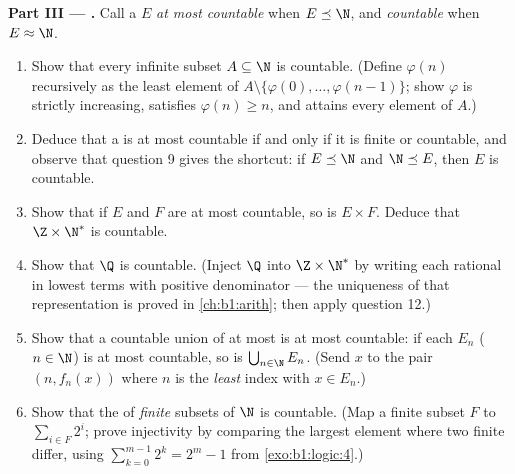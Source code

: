 \begin{problem}
\medskip
\noindent\textbf{Part III --- .} Call a  $E$
\emph{at most countable} when $E \preceq \N$, and \emph{countable}
when $E \approx \N$.
\begin{enumerate}[resume]
  \item Show that every infinite subset $A \subseteq \N$ is
        countable. (Define $\varphi(n)$ recursively as the least
        element of $A \setminus \{\varphi(0), \dots,
        \varphi(n-1)\}$; show $\varphi$ is strictly increasing,
        satisfies $\varphi(n) \geq n$, and attains every element of
        $A$.)
  \item Deduce that a  is at most countable if and only if it is
        finite or countable, and observe that question 9 gives the
        shortcut: if $E \preceq \N$ and $\N \preceq E$, then $E$ is
        countable.
  \item Show that if $E$ and $F$ are at most countable, so is $E
        \times F$. Deduce that $\Z \times \N^*$ is countable.
  \item Show that $\Q$ is countable. (Inject $\Q$ into $\Z \times
        \N^*$ by writing each rational in lowest terms with positive
        denominator --- the uniqueness of that representation is
        proved in \cref{ch:b1:arith}; then apply question 12.)
  \item Show that a countable union of at most  is at
        most countable: if each $E_n$ ($n \in \N$) is at most
        countable, so is $\bigcup_{n \in \N} E_n$. (Send $x$ to the
        pair $(n, f_n(x))$ where $n$ is the \emph{least} index with
        $x \in E_n$.)
  \item Show that the  of \emph{finite} subsets of $\N$ is
        countable. (Map a finite subset $F$ to $\sum_{i \in F} 2^i$;
        prove injectivity by comparing the largest element where two
        finite  differ, using $\sum_{k=0}^{m-1} 2^k = 2^m - 1$
        from \cref{exo:b1:logic:4}.)
\end{enumerate}


\end{problem}
